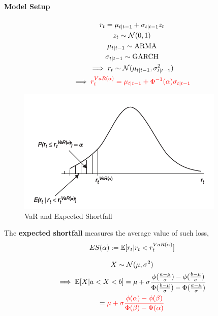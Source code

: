 \documentclass[11pt]{article}
\begin{document}
			\paragraph{Model Setup}
				\begin{gather}
					r_t = \mu_{t|t-1} + \sigma_{t|t-1}z_t \\
					z_t \sim \mathcal{{N}}(0, 1) \\
					\mu_{t|t-1} \sim \text{{ARMA}} \\
					\sigma_{t|t-1} \sim \text{{GARCH}} \\
					\implies r_t \sim \mathcal{{N}}(\mu_{t|t-1}, \sigma_{t|t-1}^2) \\
					\implies \textcolor{red}{r_t^{VaR(\alpha)} = \mu_{t|t-1} + \Phi^{-1}(\alpha) \sigma_{t|t-1}}
				\end{gather}
				
			\begin{figure}[h]
				\centering
				\includegraphics[width=0.7\linewidth]{figures/lec12.png}
				\caption{VaR and Expected Shortfall}
			\end{figure}
			
			\begin{definition}
				The \textbf{expected shortfall} measures the average value of such loss,
				\begin{equation}
					ES(\alpha) := \mathbb{E}[{r_t|r_t < r_t^{VaR(\alpha)}}]
				\end{equation}
			\end{definition}
			
			\begin{lemma}
				\begin{gather}
					X \sim \mathcal{{N}}(\mu, \sigma^2) \\
					\implies \mathbb{E}[{X|a < X < b}] = \mu + \sigma \frac{\phi(\frac{a - \mu}{\sigma}) - \phi(\frac{b - \mu}{\sigma})}{\Phi(\frac{b - \mu}{\sigma}) - \Phi(\frac{a - \mu}{\sigma})} \\
					= \textcolor{red}{\mu + \sigma \frac{\phi(\alpha) - \phi(\beta)}{\Phi(\beta) - \Phi(\alpha)}}
				\end{gather}
			\end{lemma}
			
\end{document}
